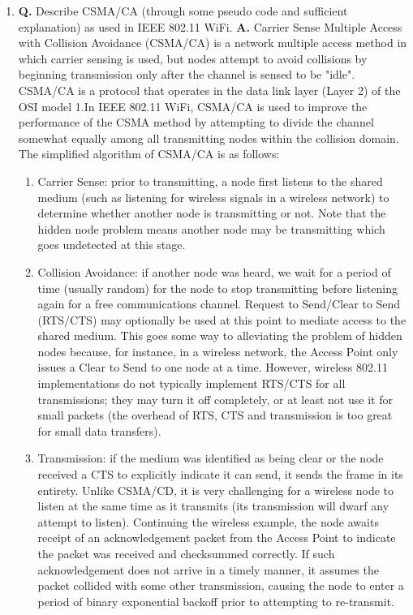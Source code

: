 \documentclass[main.tex]{subfiles}
\begin{document}
\begin{enumerate}
\begin{enumerate}
        \item \textbf{Q.} Describe CSMA/CA (through some pseudo code and sufficient explanation) as used in IEEE 802.11 WiFi. \textbf{A.} Carrier Sense Multiple Access with Collision Avoidance (CSMA/CA) is a network multiple access method in which carrier sensing is used, but nodes attempt to avoid collisions by beginning transmission only after the channel is sensed to be "idle". CSMA/CA is a protocol that operates in the data link layer (Layer 2) of the OSI model 1.In IEEE 802.11 WiFi, CSMA/CA is used to improve the performance of the CSMA method by attempting to divide the channel somewhat equally among all transmitting nodes within the collision domain. The simplified algorithm of CSMA/CA is as follows:
        \begin{enumerate}
            \item Carrier Sense: prior to transmitting, a node first listens to the shared medium (such as listening for wireless signals in a wireless network) to determine whether another node is transmitting or not. Note that the hidden node problem means another node may be transmitting which goes undetected at this stage.
            \item Collision Avoidance: if another node was heard, we wait for a period of time (usually random) for the node to stop transmitting before listening again for a free communications channel. Request to Send/Clear to Send (RTS/CTS) may optionally be used at this point to mediate access to the shared medium. This goes some way to alleviating the problem of hidden nodes because, for instance, in a wireless network, the Access Point only issues a Clear to Send to one node at a time. However, wireless 802.11 implementations do not typically implement RTS/CTS for all transmissions; they may turn it off completely, or at least not use it for small packets (the overhead of RTS, CTS and transmission is too great for small data transfers).
            \item Transmission: if the medium was identified as being clear or the node received a CTS to explicitly indicate it can send, it sends the frame in its entirety. Unlike CSMA/CD, it is very challenging for a wireless node to listen at the same time as it transmits (its transmission will dwarf any attempt to listen). Continuing the wireless example, the node awaits receipt of an acknowledgement packet from the Access Point to indicate the packet was received and checksummed correctly. If such acknowledgement does not arrive in a timely manner, it assumes the packet collided with some other transmission, causing the node to enter a period of binary exponential backoff prior to attempting to re-transmit.
        \end{enumerate}


\end{enumerate}
\end{enumerate}
\end{document}
